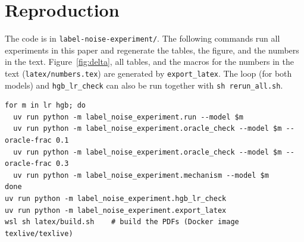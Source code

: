 \documentclass[a4paper,10pt]{article}
\begin{document}
\clearpage
\section{Reproduction}
The code is in \texttt{label-noise-experiment/}.
The following commands run all experiments in this paper and regenerate the tables, the figure, and the numbers in the text.
Figure~\ref{fig:delta}, all tables, and the macros for the numbers in the text (\texttt{latex/numbers.tex}) are generated by \texttt{export\_latex}.
The loop (for both models) and \texttt{hgb\_lr\_check} can also be run together with \texttt{sh rerun\_all.sh}.
\begin{verbatim}
for m in lr hgb; do
  uv run python -m label_noise_experiment.run --model $m
  uv run python -m label_noise_experiment.oracle_check --model $m --oracle-frac 0.1
  uv run python -m label_noise_experiment.oracle_check --model $m --oracle-frac 0.3
  uv run python -m label_noise_experiment.mechanism --model $m
done
uv run python -m label_noise_experiment.hgb_lr_check
uv run python -m label_noise_experiment.export_latex
wsl sh latex/build.sh    # build the PDFs (Docker image texlive/texlive)
\end{verbatim}
\end{document}

